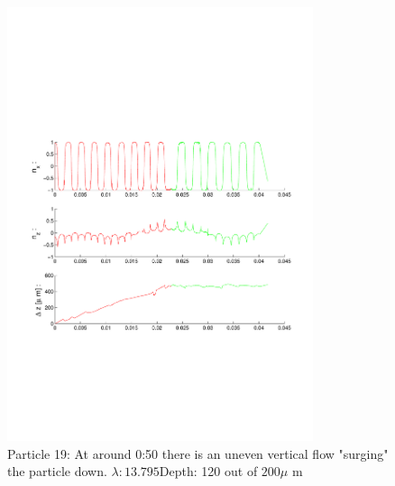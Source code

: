 \begin{figure}[ H]

\caption{Particle 19: At around 0:50 there is an uneven vertical flow "surging" the particle down. $ \lambda: 13.795$Depth: 120 out of $200 \mu $ m}

\centering

\includegraphics[width=0.8\textwidth]{Images/Particle 19/Particle19.pdf}

\end{figure}

